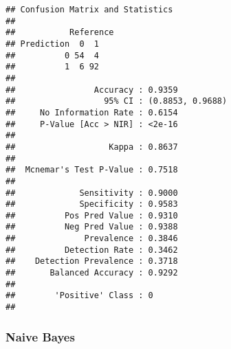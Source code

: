 \documentclass[
]{article}
\newenvironment{Shaded}{\begin{snugshade}}{\end{snugshade}}
\newcommand{\AttributeTok}[1]{\textcolor[rgb]{0.77,0.63,0.00}{#1}}
\newcommand{\DecValTok}[1]{\textcolor[rgb]{0.00,0.00,0.81}{#1}}
\newcommand{\FunctionTok}[1]{\textcolor[rgb]{0.00,0.00,0.00}{#1}}
\newcommand{\NormalTok}[1]{#1}
\newcommand{\OtherTok}[1]{\textcolor[rgb]{0.56,0.35,0.01}{#1}}
\newcommand{\SpecialCharTok}[1]{\textcolor[rgb]{0.00,0.00,0.00}{#1}}
\begin{document}
\begin{verbatim}
## Confusion Matrix and Statistics
## 
##           Reference
## Prediction  0  1
##          0 54  4
##          1  6 92
##                                           
##                Accuracy : 0.9359          
##                  95% CI : (0.8853, 0.9688)
##     No Information Rate : 0.6154          
##     P-Value [Acc > NIR] : <2e-16          
##                                           
##                   Kappa : 0.8637          
##                                           
##  Mcnemar's Test P-Value : 0.7518          
##                                           
##             Sensitivity : 0.9000          
##             Specificity : 0.9583          
##          Pos Pred Value : 0.9310          
##          Neg Pred Value : 0.9388          
##              Prevalence : 0.3846          
##          Detection Rate : 0.3462          
##    Detection Prevalence : 0.3718          
##       Balanced Accuracy : 0.9292          
##                                           
##        'Positive' Class : 0               
## 
\end{verbatim}

\hypertarget{naive-bayes}{%
\subsubsection{Naive Bayes}\label{naive-bayes}}

\begin{Shaded}
\end{Shaded}
\end{document}

